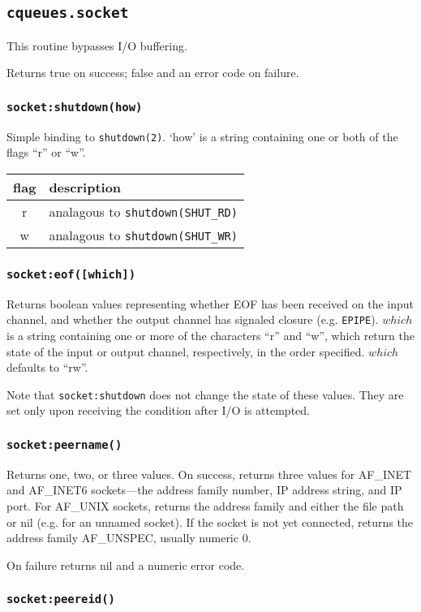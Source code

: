 \documentclass[11pt, oneside]{memoir}
\newcommand*{\syscall}[1]{\texttt{#1}\xspace}
\newcommand*{\fn}[1]{\texttt{#1}\xspace}
\newcommand*{\errno}[1]{\texttt{#1}\xspace}
\newcounter{toccols}
\newenvironment{Module}[1]{
	\subsection{\texttt{#1}}
	\addtocontents{toc}{
		\protect\begin{multicols}{\value{toccols}}
	}
}{
	\addtocontents{toc}{\protect\end{multicols}}
}
\begin{document}
\begin{Module}{cqueues.socket}
This routine bypasses I/O buffering.

Returns true on success; false and an error code on failure.

\subsubsection[\fn{socket:shutdown}]{\fn{socket:shutdown(how)}}
Simple binding to \syscall{shutdown(2)}. `how' is a string containing one or both of the flags ``r'' or ``w''.

\begin{tabular}{c | l}
flag & description \\\hline
r & analagous to \syscall{shutdown(SHUT\_RD)} \\
w & analagous to \syscall{shutdown(SHUT\_WR)} \\
\end{tabular}

\subsubsection[\fn{socket:eof}]{\fn{socket:eof([which])}}
Returns boolean values representing whether EOF has been received on the input channel, and whether the output channel has signaled closure (e.g. \errno{EPIPE}). $which$ is a string containing one or more of the characters ``r'' and ``w'', which return the state of the input or output channel, respectively, in the order specified. $which$ defaults to ``rw''.

Note that \fn{socket:shutdown} does not change the state of these values. They are set only upon receiving the condition after I/O is attempted.

\subsubsection[\fn{socket:peername}]{\fn{socket:peername()}}
Returns one, two, or three values.
On success, returns three values for AF\_INET and AF\_INET6 sockets---the address family number, IP address string, and IP port.
For AF\_UNIX sockets, returns the address family and either the file path or nil (e.g. for an unnamed socket).
If the socket is not yet connected, returns the address family AF\_UNSPEC, usually numeric 0.

On failure returns nil and a numeric error code.

\subsubsection[\fn{socket:peereid}]{\fn{socket:peereid()}}


\end{Module}
\end{document}
